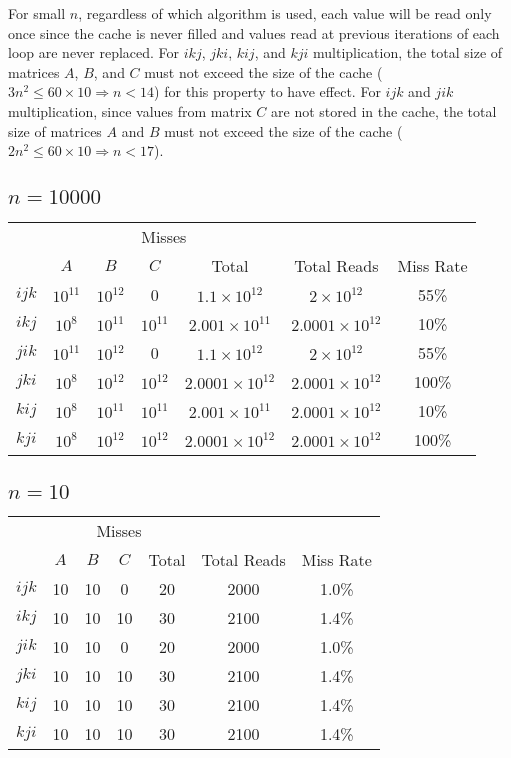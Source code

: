 \documentclass[12pt,letterpaper,oneside]{article}
\begin{document}
For small $n$, regardless of which algorithm is used, each value will be read only once since the cache is never filled and values read at previous iterations of each loop are never replaced.
For $ikj$, $jki$, $kij$, and $kji$ multiplication, the total size of matrices $A$, $B$, and $C$ must not exceed the size of the cache ($3n^2\le60\times10\Rightarrow n<14$) for this property to have effect.
For $ijk$ and $jik$ multiplication, since values from matrix $C$ are not stored in the cache, the total size of matrices $A$ and $B$ must not exceed the size of the cache ($2n^2\le60\times10\Rightarrow n<17$).

\begin{center}
	\subsection*{$n=10000$}
	\begin{tabular}{c | c c c c | c c}
		& \multicolumn{4}{c|}{Misses} &  &  \\
		& $A$ & $B$ & $C$ & Total & Total Reads & Miss Rate \\
		\hline
		$ijk$ & $10^{11}$ & $10^{12}$ & 0 & $1.1\times10^{12}$ & $2\times10^{12}$ & 55\% \\
		$ikj$ & $10^8$ & $10^{11}$ & $10^{11}$ & $2.001\times10^{11}$ & $2.0001\times10^{12}$ & 10\% \\
		$jik$ & $10^{11}$ & $10^{12}$ & 0 & $1.1\times10^{12}$ & $2\times10^{12}$ & 55\% \\
		$jki$ & $10^8$ & $10^{12}$ & $10^{12}$ & $2.0001\times10^{12}$ & $2.0001\times10^{12}$ & 100\% \\
		$kij$ & $10^8$ & $10^{11}$ & $10^{11}$ & $2.001\times10^{11}$ & $2.0001\times10^{12}$ & 10\% \\
		$kji$ & $10^8$ & $10^{12}$ & $10^{12}$ & $2.0001\times10^{12}$ & $2.0001\times10^{12}$ & 100\% 
	\end{tabular}
	\subsection*{$n=10$}
	\begin{tabular}{c | c c c c | c c}
		& \multicolumn{4}{c|}{Misses} &  &  \\
		& $A$ & $B$ & $C$ & Total & Total Reads & Miss Rate \\
		\hline
		$ijk$ & 10 & 10 & 0 & 20 & 2000 & 1.0\% \\
		$ikj$ & 10 & 10 & 10 & 30 & 2100 & 1.4\% \\
		$jik$ & 10 & 10 & 0 & 20 & 2000 & 1.0\% \\
		$jki$ & 10 & 10 & 10 & 30 & 2100 & 1.4\% \\
		$kij$ & 10 & 10 & 10 & 30 & 2100 & 1.4\% \\
		$kji$ & 10 & 10 & 10 & 30 & 2100 & 1.4\% \\
	\end{tabular}
\end{center}
\end{document}
